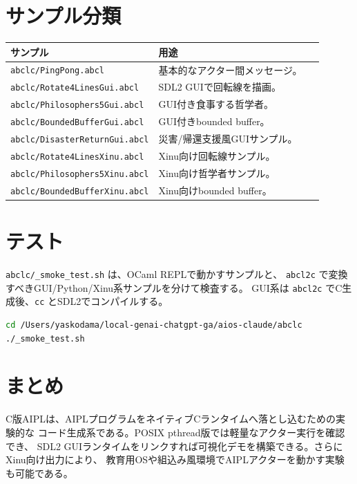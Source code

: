 \documentclass[11pt,a4paper,uplatex,dvipdfmx]{jsarticle}
\begin{document}
\section{サンプル分類}

\begin{longtable}{p{0.34\linewidth}p{0.56\linewidth}}
\toprule
サンプル & 用途 \\
\midrule
\texttt{abclc/PingPong.abcl} & 基本的なアクター間メッセージ。 \\
\texttt{abclc/Rotate4LinesGui.abcl} & SDL2 GUIで回転線を描画。 \\
\texttt{abclc/Philosophers5Gui.abcl} & GUI付き食事する哲学者。 \\
\texttt{abclc/BoundedBufferGui.abcl} & GUI付きbounded buffer。 \\
\texttt{abclc/DisasterReturnGui.abcl} & 災害/帰還支援風GUIサンプル。 \\
\texttt{abclc/Rotate4LinesXinu.abcl} & Xinu向け回転線サンプル。 \\
\texttt{abclc/Philosophers5Xinu.abcl} & Xinu向け哲学者サンプル。 \\
\texttt{abclc/BoundedBufferXinu.abcl} & Xinu向けbounded buffer。 \\
\bottomrule
\end{longtable}

\section{テスト}

\texttt{abclc/\_smoke\_test.sh} は、OCaml REPLで動かすサンプルと、
\texttt{abcl2c} で変換すべきGUI/Python/Xinu系サンプルを分けて検査する。
GUI系は \texttt{abcl2c} でC生成後、\texttt{cc} とSDL2でコンパイルする。

\begin{lstlisting}[style=aipl,language=bash]
cd /Users/yaskodama/local-genai-chatgpt-ga/aios-claude/abclc
./_smoke_test.sh
\end{lstlisting}

\section{まとめ}

C版AIPLは、AIPLプログラムをネイティブCランタイムへ落とし込むための実験的な
コード生成系である。POSIX pthread版では軽量なアクター実行を確認でき、
SDL2 GUIランタイムをリンクすれば可視化デモを構築できる。さらにXinu向け出力により、
教育用OSや組込み風環境でAIPLアクターを動かす実験も可能である。
\end{document}
